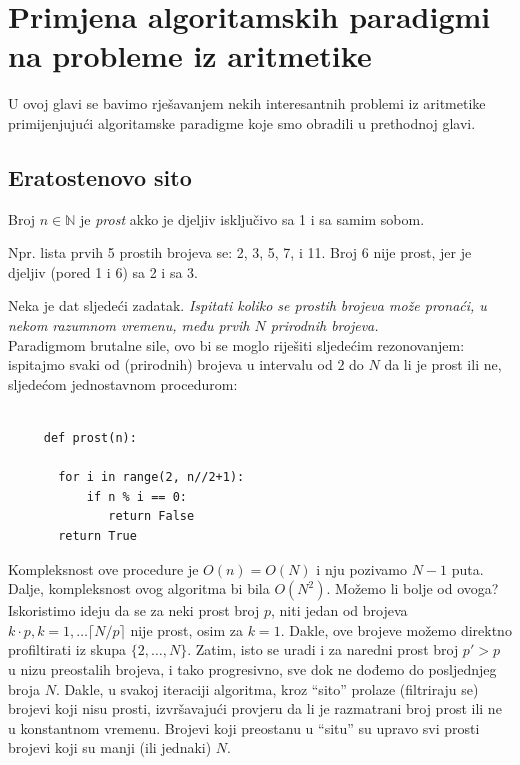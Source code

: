 \chapter[Primjena algoritamskih paradigmi ...]{Primjena algoritamskih paradigmi na probleme iz aritmetike}


U ovoj glavi se bavimo rješavanjem nekih interesantnih problemi iz
aritmetike primijenjujući algoritamske paradigme koje smo obradili u prethodnoj glavi.

\section{Eratostenovo sito}

\begin{definition}
 	Broj $n \in \mathbb{N}$ je \textit{prost} akko je djeljiv isključivo sa 1 i sa samim sobom. 
\end{definition}

Npr. lista prvih 5 prostih brojeva se: 2, 3, 5, 7, i 11. Broj 6 nije prost, jer je djeljiv (pored 1 i 6) sa 2 i sa 3. 

Neka je dat sljedeći zadatak. \emph{
Ispitati koliko se prostih brojeva može pronaći,
u nekom razumnom vremenu, među prvih ${N}$ prirodnih brojeva.} \\ 


Paradigmom brutalne sile, ovo bi se moglo riješiti sljedećim rezono\-vanjem: ispitajmo svaki od (prirodnih) brojeva u intervalu od $2$ do ${N}$ da li je prost ili ne, sljedećom jednostavnom procedurom:

\begin{verbatim}
     
     def prost(n):
       
       for i in range(2, n//2+1):
           if n % i == 0:
              return False
       return True
\end{verbatim}
Kompleksnost ove procedure je $O(n)=O(N)$ i nju pozivamo $N-1$ puta. Dalje, kompleksnost ovog algoritma bi bila $O(N^2)$. Možemo  li bolje od ovoga? \\

 Iskoristimo ideju da se za neki prost broj $p$, niti jedan od brojeva $k\cdot p, k = 1, \ldots \lceil N/ p \rceil$ nije prost, osim za $k=1$. Dakle, ove brojeve možemo direktno profiltirati iz skupa $\{2, \ldots, N\}$. Zatim, isto se uradi  i za naredni prost broj $p' >p$ u nizu preostalih brojeva, i tako progresivno, sve dok ne dođemo do posljednjeg broja $N$. Dakle, u svakoj iteraciji algoritma, kroz ``sito'' prolaze (filtriraju se) brojevi koji nisu prosti, izvršavajući   provjeru da li je razmatrani broj prost ili ne u konstantnom vremenu. Brojevi koji preostanu u ``situ'' su upravo svi prosti brojevi koji su manji (ili jednaki) $N$.

